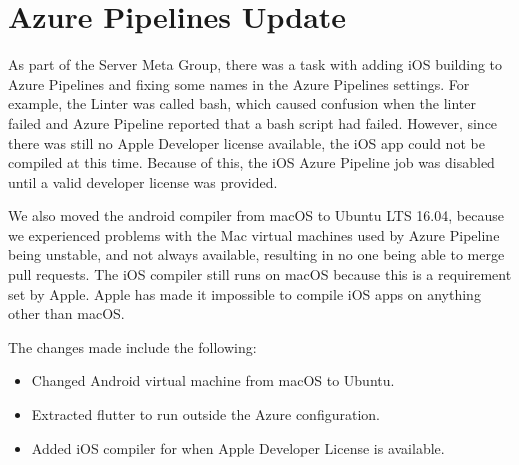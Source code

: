 \section{Azure Pipelines Update}
As part of the Server Meta Group, there was a task with adding iOS building to Azure Pipelines and fixing some names in the Azure Pipelines settings. For example, the Linter was called bash, which caused confusion when the linter failed and Azure Pipeline reported that a bash script had failed. However, since there was still no Apple Developer license available, the iOS app could not be compiled at this time. Because of this, the iOS Azure Pipeline job was disabled until a valid developer license was provided. 

We also moved the android compiler from macOS to Ubuntu LTS 16.04, because we experienced problems with the Mac virtual machines used by Azure Pipeline being unstable, and not always available, resulting in no one being able to merge pull requests. The iOS compiler still runs on macOS because this is a requirement set by Apple. Apple has made it impossible to compile iOS apps on anything other than macOS. 

The changes made include the following:
\begin{itemize}
    \item Changed Android virtual machine from macOS to Ubuntu.
    \item Extracted flutter to run outside the Azure configuration.
    \item Added iOS compiler for when Apple Developer License is available.
\end{itemize}
